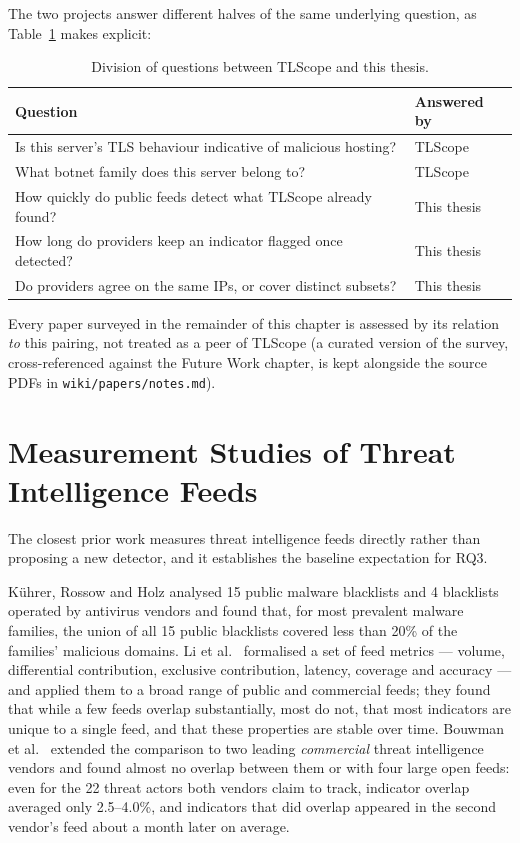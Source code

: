 The two projects answer different halves of the same underlying question, as
Table~\ref{tab:tlscope_netscan} makes explicit:

\begin{table}[h]
  \centering
  \caption{Division of questions between TLScope and this thesis.}
  \label{tab:tlscope_netscan}
  \begin{tabularx}{\linewidth}{Xl}
    \toprule
    \textbf{Question} & \textbf{Answered by} \\
    \midrule
    Is this server's TLS behaviour indicative of malicious hosting? & TLScope \\
    What botnet family does this server belong to?                 & TLScope \\
    How quickly do public feeds detect what TLScope already found?  & This thesis \\
    How long do providers keep an indicator flagged once detected?  & This thesis \\
    Do providers agree on the same IPs, or cover distinct subsets?  & This thesis \\
    \bottomrule
  \end{tabularx}
\end{table}

Every paper surveyed in the remainder of this chapter is assessed by its relation \emph{to} this
pairing, not treated as a peer of TLScope (a curated version of the survey, cross-referenced against
the Future Work chapter, is kept alongside the source PDFs in \texttt{wiki/papers/notes.md}).

\section{Measurement Studies of Threat Intelligence Feeds}
\label{sec:rw_ti_measurement}

The closest prior work measures threat intelligence feeds directly rather than proposing a new
detector, and it establishes the baseline expectation for RQ3.

Kührer, Rossow and Holz \cite{kuhrer2014paintitblack} analysed 15 public malware blacklists and 4
blacklists operated by antivirus vendors and found that, for most prevalent malware families, the
union of all 15 public blacklists covered less than 20\% of the families' malicious domains. Li et
al.\ \cite{li2019teaLeaves} formalised a set of feed metrics --- volume, differential contribution,
exclusive contribution, latency, coverage and accuracy --- and applied them to a broad range of
public and commercial feeds; they found that while a few feeds overlap substantially, most do not,
that most indicators are unique to a single feed, and that these properties are stable over time.
Bouwman et al.\ \cite{bouwman2020differentcup} extended the comparison to two leading
\emph{commercial} threat intelligence vendors and found almost no overlap between them or with four
large open feeds: even for the 22 threat actors both vendors claim to track, indicator overlap
averaged only 2.5--4.0\%, and indicators that did overlap appeared in the second vendor's feed about
a month later on average.

